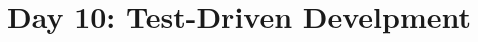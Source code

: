 \documentclass{article}
\begin{document}
\title{Day 10: Test-Driven Develpment}
\author{}
\date{}
\maketitle


\end{document}
